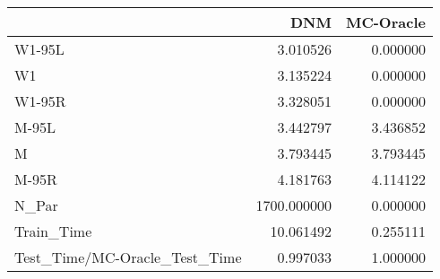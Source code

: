\begin{tabular}{lrr}
\toprule
{} &          DNM &  MC-Oracle \\
\midrule
W1-95L                        &     3.010526 &   0.000000 \\
W1                            &     3.135224 &   0.000000 \\
W1-95R                        &     3.328051 &   0.000000 \\
M-95L                         &     3.442797 &   3.436852 \\
M                             &     3.793445 &   3.793445 \\
M-95R                         &     4.181763 &   4.114122 \\
N\_Par                         &  1700.000000 &   0.000000 \\
Train\_Time                    &    10.061492 &   0.255111 \\
Test\_Time/MC-Oracle\_Test\_Time &     0.997033 &   1.000000 \\
\bottomrule
\end{tabular}
